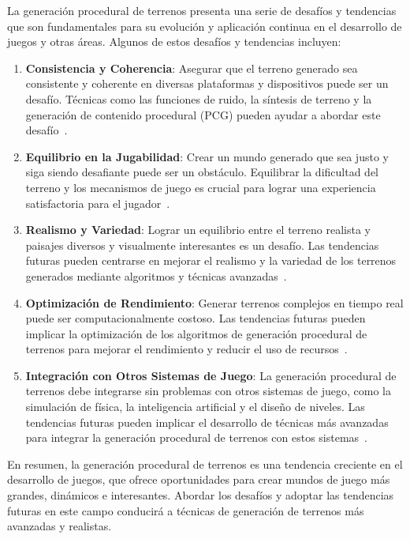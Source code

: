 La generación procedural de terrenos presenta una serie de desafíos y tendencias que son fundamentales para su evolución y aplicación continua en el desarrollo de juegos y otras áreas. Algunos de estos desafíos y tendencias incluyen:

\begin{enumerate}
    \item \textbf{Consistencia y Coherencia}: Asegurar que el terreno generado sea consistente y coherente en diversas plataformas y dispositivos puede ser un desafío. Técnicas como las funciones de ruido, la síntesis de terreno y la generación de contenido procedural (PCG) pueden ayudar a abordar este desafío~\cite{ConsistencyCoherence}.
    
    \item \textbf{Equilibrio en la Jugabilidad}: Crear un mundo generado que sea justo y siga siendo desafiante puede ser un obstáculo. Equilibrar la dificultad del terreno y los mecanismos de juego es crucial para lograr una experiencia satisfactoria para el jugador~\cite{BalancedGameplay}.
    
    \item \textbf{Realismo y Variedad}: Lograr un equilibrio entre el terreno realista y paisajes diversos y visualmente interesantes es un desafío. Las tendencias futuras pueden centrarse en mejorar el realismo y la variedad de los terrenos generados mediante algoritmos y técnicas avanzadas~\cite{RealismVariety}.
    
    \item \textbf{Optimización de Rendimiento}: Generar terrenos complejos en tiempo real puede ser computacionalmente costoso. Las tendencias futuras pueden implicar la optimización de los algoritmos de generación procedural de terrenos para mejorar el rendimiento y reducir el uso de recursos~\cite{PerformanceOptimization}.
    
    \item \textbf{Integración con Otros Sistemas de Juego}: La generación procedural de terrenos debe integrarse sin problemas con otros sistemas de juego, como la simulación de física, la inteligencia artificial y el diseño de niveles. Las tendencias futuras pueden implicar el desarrollo de técnicas más avanzadas para integrar la generación procedural de terrenos con estos sistemas~\cite{IntegrationWithGameSystems}.
\end{enumerate}

En resumen, la generación procedural de terrenos es una tendencia creciente en el desarrollo de juegos, que ofrece oportunidades para crear mundos de juego más grandes, dinámicos e interesantes. Abordar los desafíos y adoptar las tendencias futuras en este campo conducirá a técnicas de generación de terrenos más avanzadas y realistas.

